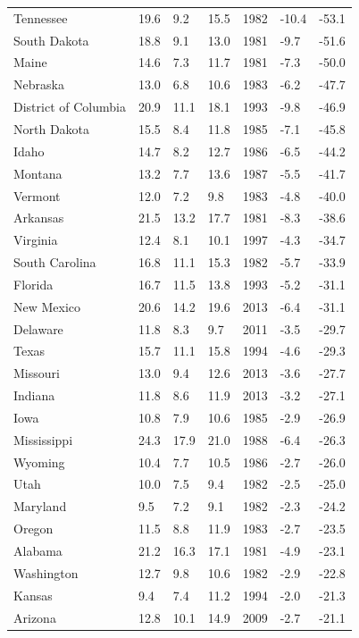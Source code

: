 \begin{longtable}{llllrll}
Tennessee & 19.6 & 9.2 & 15.5 & 1982 & -10.4 & -53.1 \\
South Dakota & 18.8 & 9.1 & 13.0 & 1981 & -9.7 & -51.6 \\
Maine & 14.6 & 7.3 & 11.7 & 1981 & -7.3 & -50.0 \\
Nebraska & 13.0 & 6.8 & 10.6 & 1983 & -6.2 & -47.7 \\
District of Columbia & 20.9 & 11.1 & 18.1 & 1993 & -9.8 & -46.9 \\
North Dakota & 15.5 & 8.4 & 11.8 & 1985 & -7.1 & -45.8 \\
Idaho & 14.7 & 8.2 & 12.7 & 1986 & -6.5 & -44.2 \\
Montana & 13.2 & 7.7 & 13.6 & 1987 & -5.5 & -41.7 \\
Vermont & 12.0 & 7.2 & 9.8 & 1983 & -4.8 & -40.0 \\
Arkansas & 21.5 & 13.2 & 17.7 & 1981 & -8.3 & -38.6 \\
Virginia & 12.4 & 8.1 & 10.1 & 1997 & -4.3 & -34.7 \\
South Carolina & 16.8 & 11.1 & 15.3 & 1982 & -5.7 & -33.9 \\
Florida & 16.7 & 11.5 & 13.8 & 1993 & -5.2 & -31.1 \\
New Mexico & 20.6 & 14.2 & 19.6 & 2013 & -6.4 & -31.1 \\
Delaware & 11.8 & 8.3 & 9.7 & 2011 & -3.5 & -29.7 \\
Texas & 15.7 & 11.1 & 15.8 & 1994 & -4.6 & -29.3 \\
Missouri & 13.0 & 9.4 & 12.6 & 2013 & -3.6 & -27.7 \\
Indiana & 11.8 & 8.6 & 11.9 & 2013 & -3.2 & -27.1 \\
Iowa & 10.8 & 7.9 & 10.6 & 1985 & -2.9 & -26.9 \\
Mississippi & 24.3 & 17.9 & 21.0 & 1988 & -6.4 & -26.3 \\
Wyoming & 10.4 & 7.7 & 10.5 & 1986 & -2.7 & -26.0 \\
Utah & 10.0 & 7.5 & 9.4 & 1982 & -2.5 & -25.0 \\
Maryland & 9.5 & 7.2 & 9.1 & 1982 & -2.3 & -24.2 \\
Oregon & 11.5 & 8.8 & 11.9 & 1983 & -2.7 & -23.5 \\
Alabama & 21.2 & 16.3 & 17.1 & 1981 & -4.9 & -23.1 \\
Washington & 12.7 & 9.8 & 10.6 & 1982 & -2.9 & -22.8 \\
Kansas & 9.4 & 7.4 & 11.2 & 1994 & -2.0 & -21.3 \\
Arizona & 12.8 & 10.1 & 14.9 & 2009 & -2.7 & -21.1 \\

\end{longtable}
